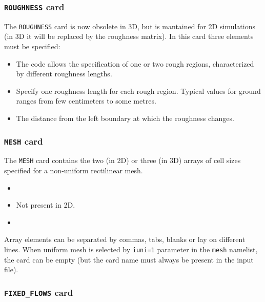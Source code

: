 \subsubsection{{\tt ROUGHNESS} card}

The {\tt ROUGHNESS} card is now obsolete in 3D, but is mantained for 2D 
simulations (in 3D it will be replaced by the roughness matrix). In this
card three elements must be specified:
\begin{itemize}
\item
{}
{The code allows the specification of one or two rough regions, characterized
by different roughness lengths.}

\item
{}
{Specify one roughness length for each rough region. Typical values for ground
ranges from few centimeters to some metres.}

\item
{}
{The distance from the left boundary at which the roughness changes.}

\end{itemize}

\subsubsection{{\tt MESH} card}

The {\tt MESH} card contains the two (in 2D) or three (in 3D) arrays of cell 
sizes specified for a non-uniform rectilinear mesh. 

\begin{itemize}
\item
{}
{}

\item
{}
{Not present in 2D.}

\item
{}
{}
\end{itemize}

Array elements can be separated by commas, tabs, blanks or lay on different
lines.  When uniform mesh is selected by {\tt iuni=1} parameter in the 
{\tt mesh} namelist, the card can be empty (but the card 
name must always be present in the input file).

\subsubsection{{\tt FIXED\_FLOWS} card}

